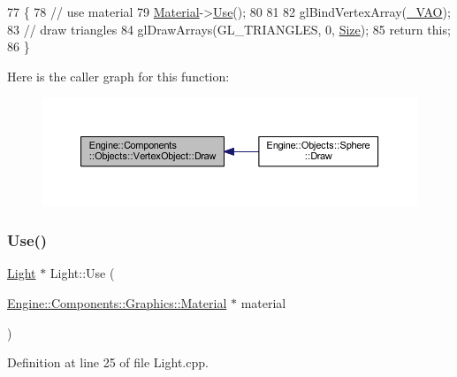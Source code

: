 \begin{DoxyCode}
77 \{
78     \textcolor{comment}{// use material}
79     \mbox{\hyperlink{classEngine_1_1Components_1_1Objects_1_1VertexObject_a86c1fced4cdc5e59a66a635390a17eca}{Material}}->\mbox{\hyperlink{classEngine_1_1Components_1_1Graphics_1_1Material_aef1dd6fbbf0268d4f3e6c371a2f1aa8d}{Use}}();
80 
81 
82     glBindVertexArray(\mbox{\hyperlink{classEngine_1_1Components_1_1Objects_1_1VertexObject_ae85ac9d5ded8f54d58feb7fb78e75130}{\_VAO}});
83     \textcolor{comment}{// draw triangles}
84     glDrawArrays(GL\_TRIANGLES, 0, \mbox{\hyperlink{classEngine_1_1Components_1_1Objects_1_1VertexObject_a13ec6e4a92520bdd1b33ad6de757cb92}{Size}});
85     \textcolor{keywordflow}{return} \textcolor{keyword}{this};
86 \}
\end{DoxyCode}
Here is the caller graph for this function\+:
\nopagebreak
\begin{figure}[H]
\begin{center}
\leavevmode
\includegraphics[width=350pt]{classEngine_1_1Components_1_1Objects_1_1VertexObject_a53a8f546ee082720579e2c33be6cedec_icgraph}
\end{center}
\end{figure}
\mbox{\label{classLight_a3ee17fe1c669589285bd5c8b29b13721}} 
\subsubsection{\texorpdfstring{Use()}{Use()}}
{\footnotesize\ttfamily \mbox{\hyperlink{classLight}{Light}} $\ast$ Light\+::\+Use (\begin{DoxyParamCaption}\item[{\mbox{\hyperlink{classEngine_1_1Components_1_1Graphics_1_1Material}{Engine\+::\+Components\+::\+Graphics\+::\+Material}} $\ast$}]{material }\end{DoxyParamCaption})}



Definition at line 25 of file Light.\+cpp.



